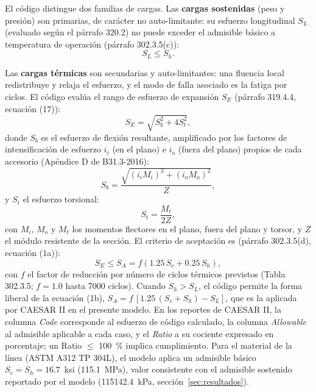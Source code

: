 El c\'{o}digo distingue dos familias de cargas. Las \textbf{cargas sostenidas}
(peso y presi\'{o}n) son primarias, de car\'{a}cter no auto-limitante: su esfuerzo
longitudinal $S_L$ (evaluado seg\'{u}n el p\'{a}rrafo 320.2) no puede exceder el
admisible b\'{a}sico a temperatura de operaci\'{o}n (p\'{a}rrafo 302.3.5(c)):
\begin{equation}
    S_L \leq S_h.
    \label{eq:sl}
\end{equation}

Las \textbf{cargas t\'{e}rmicas} son secundarias y auto-limitantes: una fluencia
local redistribuye y relaja el esfuerzo, y el modo de falla asociado es la fatiga
por ciclos. El c\'{o}digo eval\'{u}a el rango de esfuerzo de expansi\'{o}n $S_E$
(p\'{a}rrafo 319.4.4, ecuaci\'{o}n (17)):
\begin{equation}
    S_E = \sqrt{S_b^2 + 4 S_t^2},
    \label{eq:se}
\end{equation}
donde $S_b$ es el esfuerzo de flexi\'{o}n resultante, amplificado por los
factores de intensificaci\'{o}n de esfuerzo $i_i$ (en el plano) e $i_o$ (fuera del
plano) propios de cada accesorio (Ap\'{e}ndice D de B31.3-2016):
\begin{equation}
    S_b = \frac{\sqrt{(i_i M_i)^2 + (i_o M_o)^2}}{Z},
    \label{eq:sb}
\end{equation}
y $S_t$ el esfuerzo torsional:
\begin{equation}
    S_t = \frac{M_t}{2 Z},
    \label{eq:st}
\end{equation}
con $M_i$, $M_o$ y $M_t$ los momentos flectores en el plano, fuera del plano y
torsor, y $Z$ el m\'{o}dulo resistente de la secci\'{o}n. El criterio de
aceptaci\'{o}n es (p\'{a}rrafo 302.3.5(d), ecuaci\'{o}n (1a)):
\begin{equation}
    S_E \leq S_A = f \left( 1.25 \, S_c + 0.25 \, S_h \right),
    \label{eq:sa}
\end{equation}
con $f$ el factor de reducci\'{o}n por n\'{u}mero de ciclos t\'{e}rmicos previstos
(Tabla 302.3.5; $f = 1.0$ hasta 7000 ciclos). Cuando $S_h > S_L$, el c\'{o}digo
permite la forma liberal de la ecuaci\'{o}n (1b),
$S_A = f\,[1.25\,(S_c + S_h) - S_L]$, que es la aplicada por CAESAR II en el
presente modelo. En los reportes de CAESAR II, la columna \textit{Code}
corresponde al esfuerzo de c\'{o}digo calculado, la columna \textit{Allowable} al
admisible aplicable a cada caso, y el \textit{Ratio} a su cociente expresado en
porcentaje; un Ratio $\leq$ 100~\% implica cumplimiento. Para el material de la
l\'{i}nea (ASTM A312 TP 304L), el modelo aplica un admisible b\'{a}sico
$S_c = S_h = 16.7$~ksi (\num{115.1}~\si{MPa}), valor consistente con el
admisible sostenido reportado por el modelo (\num{115142.4}~\si{kPa},
secci\'{o}n~\ref{sec:resultados}).

